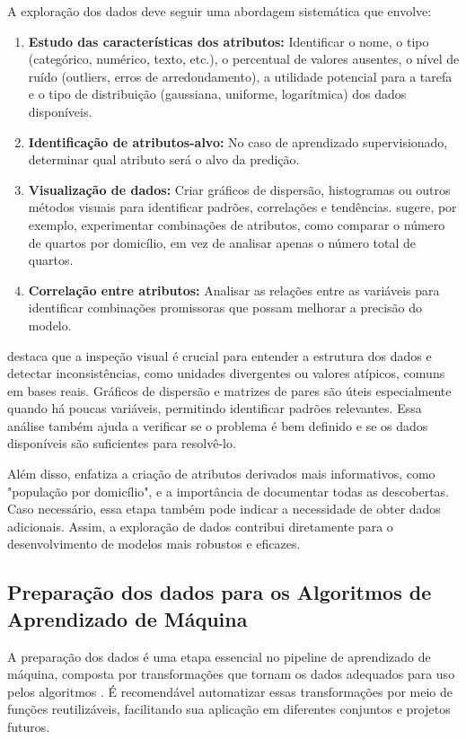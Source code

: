 A exploração dos dados deve seguir uma abordagem sistemática que envolve:
\begin{enumerate}
    \item \textbf{Estudo das características dos atributos:} Identificar o nome, o tipo (categórico, numérico, texto, etc.), o percentual de valores ausentes, o nível de ruído (outliers, erros de arredondamento), a utilidade potencial para a tarefa e o tipo de distribuição (gaussiana, uniforme, logarítmica) dos dados disponíveis.
    \item \textbf{Identificação de atributos-alvo:} No caso de aprendizado supervisionado, determinar qual atributo será o alvo da predição.
    \item \textbf{Visualização de dados:} Criar gráficos de dispersão, histogramas ou outros métodos visuais para identificar padrões, correlações e tendências.  sugere, por exemplo, experimentar combinações de atributos, como comparar o número de quartos por domicílio, em vez de analisar apenas o número total de quartos.
    \item \textbf{Correlação entre atributos:} Analisar as relações entre as variáveis para identificar combinações promissoras que possam melhorar a precisão do modelo.
\end{enumerate}

 destaca que a inspeção visual é crucial para entender a estrutura dos dados e detectar inconsistências, como unidades divergentes ou valores atípicos, comuns em bases reais. Gráficos de dispersão e matrizes de pares são úteis especialmente quando há poucas variáveis, permitindo identificar padrões relevantes. Essa análise também ajuda a verificar se o problema é bem definido e se os dados disponíveis são suficientes para resolvê-lo.

Além disso,  enfatiza a criação de atributos derivados mais informativos, como "população por domicílio", e a importância de documentar todas as descobertas. Caso necessário, essa etapa também pode indicar a necessidade de obter dados adicionais. Assim, a exploração de dados contribui diretamente para o desenvolvimento de modelos mais robustos e eficazes.

\subsection{Preparação dos dados para os Algoritmos de Aprendizado de Máquina}
A preparação dos dados é uma etapa essencial no pipeline de aprendizado de máquina, composta por transformações que tornam os dados adequados para uso pelos algoritmos \cite{geron2017}. É recomendável automatizar essas transformações por meio de funções reutilizáveis, facilitando sua aplicação em diferentes conjuntos e projetos futuros.


